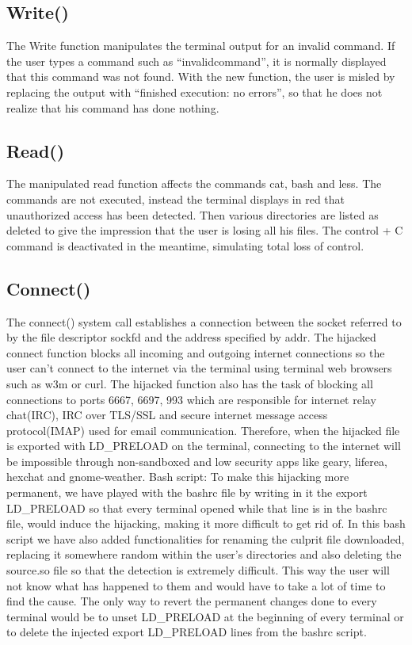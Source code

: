 \subsection{Write()}
The Write function manipulates the terminal output for an invalid command. 
If the user types a command such as “invalidcommand”, it is normally displayed that this command was not found. 
With the new function, the user is misled by replacing the output with “finished execution: no errors”, so that he does not realize that his command has done nothing.

\subsection{Read()}
The manipulated read function affects the commands cat, bash and less. 
The commands are not executed, instead the terminal displays in red that unauthorized access has been detected. 
Then various directories are listed as deleted to give the impression that the user is losing all his files. 
The control + C command is deactivated in the meantime, simulating total loss of control.

\subsection{Connect()}
The connect() system call establishes a connection between the socket referred to by the file descriptor sockfd and the address specified by addr. The hijacked connect function blocks all incoming and outgoing internet connections so the user can’t connect to the internet via the terminal using terminal web browsers such as w3m or curl. The hijacked function also has the task of blocking all connections to ports 6667, 6697, 993 which are responsible for internet relay chat(IRC), IRC over TLS/SSL and secure internet message access protocol(IMAP) used for email communication. Therefore, when the hijacked file is exported with LD_PRELOAD on the terminal, connecting to the internet will be impossible through non-sandboxed and low security apps like geary, liferea, hexchat and gnome-weather. 
Bash script: To make this hijacking more permanent, we have played with the bashrc file by writing in it the export LD_PRELOAD so that every terminal opened while that line is in the bashrc file, would induce the hijacking, making it more difficult to get rid of. In this bash script we have also added functionalities for renaming the culprit file downloaded, replacing it somewhere random within the user’s directories and also deleting the source.so file so that the detection is extremely difficult. This way the user will not know what has happened to them and would have to take a lot of time to find the cause. The only way to revert the permanent changes done to every terminal would be to unset LD_PRELOAD at the beginning of every terminal or to delete the injected export LD_PRELOAD lines from the bashrc script.



